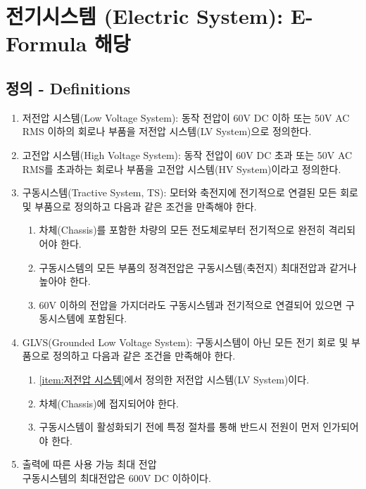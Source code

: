 \documentclass[final,a4paper,10pt]{report}
\begin{document}
\chapter{전기시스템 (Electric System): E-Formula 해당}

\section{정의 - Definitions}
\begin{enumerate}
  \item 저전압 시스템(Low Voltage System): 동작 전압이 60V DC 이하 또는 50V AC RMS 이하의 회로나 부품을 저전압 시스템(LV System)으로 정의한다. \label{item:저전압 시스템}
  \item 고전압 시스템(High Voltage System): 동작 전압이 60V DC 초과 또는 50V AC RMS를 초과하는 회로나 부품을 고전압 시스템(HV System)이라고 정의한다.
  \item 구동시스템(Tractive System, TS): 모터와 축전지에 전기적으로 연결된 모든 회로 및 부품으로 정의하고 다음과 같은 조건을 만족해야 한다. \label{item:구동시스템}
    \begin{enumerate}
      \item 차체(Chassis)를 포함한 차량의 모든 전도체로부터 전기적으로 완전히 격리되어야 한다.
      \item 구동시스템의 모든 부품의 정격전압은 구동시스템(축전지) 최대전압과 같거나 높아야 한다.
      \item 60V 이하의 전압을 가지더라도 구동시스템과 전기적으로 연결되어 있으면 구동시스템에 포함된다.
    \end{enumerate}
    
  \item GLVS(Grounded Low Voltage System): 구동시스템이 아닌 모든 전기 회로 및 부품으로 정의하고 다음과 같은 조건을 만족해야 한다.
    \begin{enumerate}
      \item \cref{item:저전압 시스템}에서 정의한 저전압 시스템(LV System)이다.
      \item 차체(Chassis)에 접지되어야 한다.
      \item 구동시스템이 활성화되기 전에 특정 절차를 통해 반드시 전원이 먼저 인가되어야 한다.
    \end{enumerate}
    
  \item 출력에 따른 사용 가능 최대 전압\\ \label{item:출력에 따른 사용 가능 최대 전압}
    구동시스템의 최대전압은 600V DC 이하이다.
    

\end{enumerate}
\end{document}
